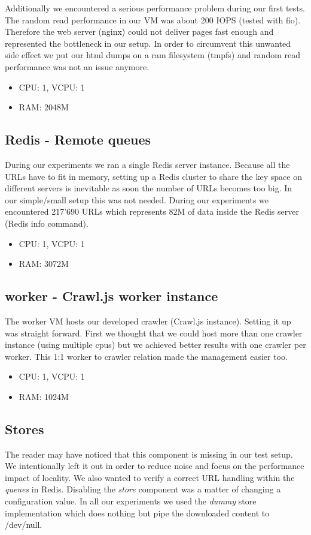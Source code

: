 Additionally we encountered a serious performance problem during our first tests. The random read performance in our VM was about 200 IOPS (tested with fio). Therefore the web server (nginx) could not deliver pages fast enough and represented the bottleneck in our setup. In order to circumvent this unwanted side effect we put our html dumps on a ram filesystem (tmpfs) and random read performance was not an issue anymore.

\begin{itemize}
  \item CPU: 1, VCPU: 1
  \item RAM: 2048M
\end{itemize}

\subsection{Redis - Remote queues}
During our experiments we ran a single Redis server instance. Because all the URLs have to fit in memory, setting up a Redis cluster to share the key space on different servers is inevitable as soon the number of URLs becomes too big. In our simple/small setup this was not needed. During our experiments we encountered 217'690 URLs which represents 82M of data inside the Redis server (Redis info command).

\begin{itemize}
  \item CPU: 1, VCPU: 1
  \item RAM: 3072M
\end{itemize}

\subsection{worker - Crawl.js worker instance}
The worker VM hosts our developed crawler (Crawl.js instance). Setting it up was straight forward. First we thought that we could host more than one crawler instance (using multiple cpus) but we achieved better results with one crawler per worker. This 1:1 worker to crawler relation made the management easier too.

\begin{itemize}
  \item CPU: 1, VCPU: 1
  \item RAM: 1024M
\end{itemize}

\subsection{Stores}
The reader may have noticed that this component is missing in our test setup. We intentionally left it out in order to reduce noise and focus on the performance impact of locality. We also wanted to verify a correct URL handling within the \emph{queues} in Redis. Disabling the \emph{store} component was a matter of changing a configuration value. In all our experiments we used the \emph{dummy} store implementation which does nothing but pipe the downloaded content to /dev/null.

